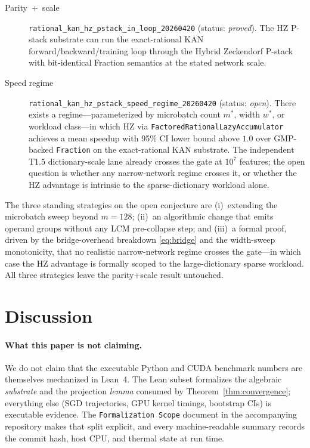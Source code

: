 \documentclass[11pt,a4paper]{article}
\begin{document}
\begin{description}
\item[Parity~+~scale] \texttt{rational\_kan\_hz\_pstack\_in\_loop\_20260420}
(status: \emph{proved}). The HZ P-stack substrate can run the
exact-rational KAN forward/backward/training loop through the Hybrid
Zeckendorf P-stack with bit-identical Fraction semantics at the stated
network scale.
\item[Speed regime] \texttt{rational\_kan\_hz\_pstack\_speed\_regime\_20260420}
(status: \emph{open}). There exists a regime---parameterized by
microbatch count $m^{\ast}$, width $w^{\ast}$, or workload
class---in which HZ via \texttt{FactoredRationalLazyAccumulator}
achieves a mean speedup with 95\% CI lower bound above $1.0$ over
GMP-backed \texttt{Fraction} on the exact-rational KAN substrate.
The independent T1.5 dictionary-scale lane already crosses the gate at
$10^{7}$ features; the open question is whether any narrow-network
regime crosses it, or whether the HZ advantage is intrinsic to the
sparse-dictionary workload alone.
\end{description}

The three standing strategies on the open conjecture are
(i)~extending the microbatch sweep beyond $m=128$;
(ii)~an algorithmic change that emits operand groups without any
LCM pre-collapse step; and (iii)~a formal proof, driven by the
bridge-overhead breakdown \eqref{eq:bridge} and the width-sweep
monotonicity, that no realistic narrow-network regime crosses the
gate---in which case the HZ advantage is formally scoped to the
large-dictionary sparse workload. All three strategies leave the
parity+scale result untouched.

\section{Discussion}
\label{sec:discussion}

\paragraph{What this paper is not claiming.}
We do not claim that the executable Python and CUDA benchmark numbers
are themselves mechanized in Lean~4. The Lean subset formalizes the
algebraic \emph{substrate} and the projection \emph{lemma} consumed by
Theorem~\ref{thm:convergence}; everything else (SGD trajectories,
GPU kernel timings, bootstrap CIs) is executable evidence. The
\texttt{Formalization Scope} document in the accompanying repository
makes that split explicit, and every machine-readable summary records
the commit hash, host CPU, and thermal state at run time.
\end{document}
